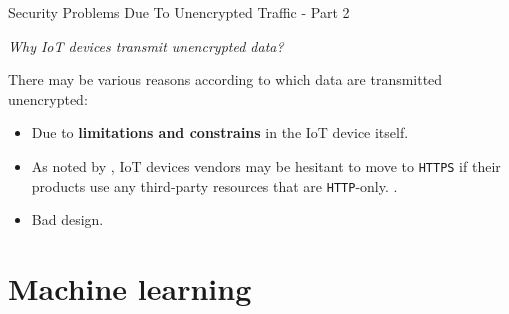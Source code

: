 \documentclass[10pt]{beamer}
\begin{document}
\begin{frame}{Security Problems Due To Unencrypted Traffic - Part 2}

\begin{alertblock}{}
\textit{Why IoT devices transmit unencrypted data?}
\end{alertblock}

There may be various reasons according to which data are transmitted unencrypted:

\begin{itemize}
\justifying

\item Due to \textbf{limitations and constrains} in the IoT device itself. 

\item As noted by \citet{mazhar2020characterizing}, IoT devices vendors may be hesitant to move to \texttt{HTTPS} if their products use any third-party resources that are \texttt{HTTP}-only. \cite{mazhar2020characterizing}.

\item Bad design.

\end{itemize}


\end{frame} 
\section{Machine learning}
\end{document}

